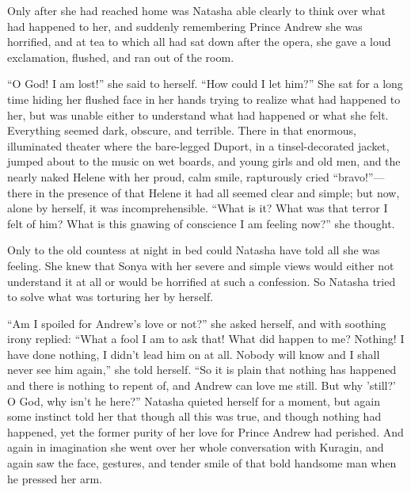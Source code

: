 Only after she had reached home was Natasha able clearly to think
over what had happened to her, and suddenly remembering Prince
Andrew she was horrified, and at tea to which all had sat down
after the opera, she gave a loud exclamation, flushed, and ran
out of the room.

``O God! I am lost!'' she said to herself. ``How could I let
him?'' She sat for a long time hiding her flushed face in her
hands trying to realize what had happened to her, but was unable
either to understand what had happened or what she
felt. Everything seemed dark, obscure, and terrible. There in
that enormous, illuminated theater where the bare-legged Duport,
in a tinsel-decorated jacket, jumped about to the music on wet
boards, and young girls and old men, and the nearly naked Helene
with her proud, calm smile, rapturously cried ``bravo!''---there
in the presence of that Helene it had all seemed clear and
simple; but now, alone by herself, it was
incomprehensible. ``What is it? What was that terror I felt of
him? What is this gnawing of conscience I am feeling now?'' she
thought.

Only to the old countess at night in bed could Natasha have told
all she was feeling. She knew that Sonya with her severe and
simple views would either not understand it at all or would be
horrified at such a confession. So Natasha tried to solve what
was torturing her by herself.

``Am I spoiled for Andrew's love or not?'' she asked herself, and
with soothing irony replied: ``What a fool I am to ask that! What
did happen to me? Nothing! I have done nothing, I didn't lead him
on at all. Nobody will know and I shall never see him again,''
she told herself. ``So it is plain that nothing has happened and
there is nothing to repent of, and Andrew can love me still. But
why 'still?' O God, why isn't he here?''  Natasha quieted herself
for a moment, but again some instinct told her that though all
this was true, and though nothing had happened, yet the former
purity of her love for Prince Andrew had perished. And again in
imagination she went over her whole conversation with Kuragin,
and again saw the face, gestures, and tender smile of that bold
handsome man when he pressed her arm.


